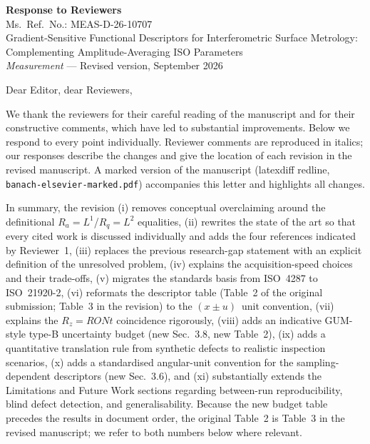 \documentclass[11pt,a4paper]{article}
\begin{document}
\begin{center}
{\Large\bfseries Response to Reviewers}\\[0.4em]
{\large Ms.\ Ref.\ No.: MEAS-D-26-10707}\\[0.3em]
Gradient-Sensitive Functional Descriptors for Interferometric Surface Metrology:\\
Complementing Amplitude-Averaging ISO Parameters\\[0.3em]
\textit{Measurement} --- Revised version, September 2026
\end{center}

\bigskip

Dear Editor, dear Reviewers,

We thank the reviewers for their careful reading of the manuscript and for their constructive comments, which have led to substantial improvements. Below we respond to every point individually. Reviewer comments are reproduced in italics; our responses describe the changes and give the location of each revision in the revised manuscript. A marked version of the manuscript (latexdiff redline, \texttt{banach-elsevier-marked.pdf}) accompanies this letter and highlights all changes.

In summary, the revision (i) removes conceptual overclaiming around the definitional $R_a=L^1$/$R_q=L^2$ equalities, (ii) rewrites the state of the art so that every cited work is discussed individually and adds the four references indicated by Reviewer~1, (iii) replaces the previous research-gap statement with an explicit definition of the unresolved problem, (iv) explains the acquisition-speed choices and their trade-offs, (v) migrates the standards basis from ISO~4287 to ISO~21920-2, (vi) reformats the descriptor table (Table~2 of the original submission; Table~3 in the revision) to the $(x \pm u)$~unit convention, (vii) explains the $R_z = RONt$ coincidence rigorously, (viii) adds an indicative GUM-style type-B uncertainty budget (new Sec.~3.8, new Table~2), (ix) adds a quantitative translation rule from synthetic defects to realistic inspection scenarios, (x) adds a standardised angular-unit convention for the sampling-dependent descriptors (new Sec.~3.6), and (xi) substantially extends the Limitations and Future Work sections regarding between-run reproducibility, blind defect detection, and generalisability. Because the new budget table precedes the results in document order, the original Table~2 is Table~3 in the revised manuscript; we refer to both numbers below where relevant.
\end{document}

